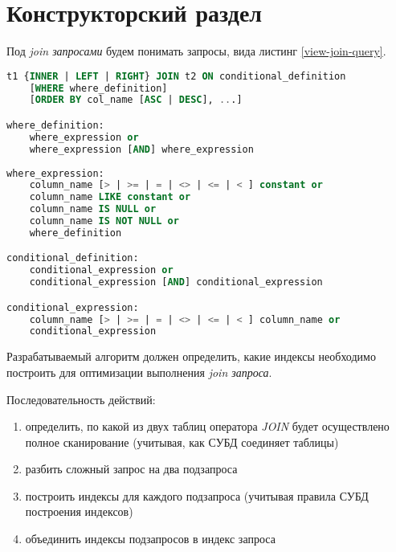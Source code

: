 \chapter{Конструкторский раздел}

Под \textit{join запросами} будем понимать запросы, вида листинг \ref{view-join-query}.

\begin{lstlisting}[language=sql, caption={Вид join запроса},label=view-join-query]
t1 {INNER | LEFT | RIGHT} JOIN t2 ON conditional_definition
    [WHERE where_definition]
    [ORDER BY col_name [ASC | DESC], ...]

where_definition:
    where_expression or 
    where_expression [AND] where_expression 
    
where_expression:
    column_name [> | >= | = | <> | <= | < ] constant or
    column_name LIKE constant or
    column_name IS NULL or 
    column_name IS NOT NULL or 
    where_definition   

conditional_definition:
    conditional_expression or 
    conditional_expression [AND] conditional_expression 

conditional_expression:
    column_name [> | >= | = | <> | <= | < ] column_name or
    conditional_expression
\end{lstlisting}

Разрабатываемый алгоритм должен определить, какие индексы необ­ходимо построить для оптимизации выполнения \textit{join запроса}.

Последовательность действий:
\begin{enumerate}
\item определить, по какой из двух таблиц оператора \textit{JOIN} будет осу­ществлено полное сканирование (учитывая, как СУБД соединяет таблицы)
\item разбить сложный запрос на два подзапроса
\item построить индексы для каждого подзапроса (учитывая правила СУБД построения индексов)
\item объединить индексы подзапросов в индекс запроса
\end{enumerate}



